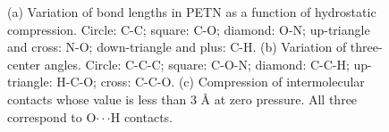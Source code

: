 \documentclass[prb,aps,nobibnotes,twocolumn,doublespace,twocolumngrid,superbib]{revtex4}
\begin{document}
\begin{figure}
\caption{(a) Variation of bond lengths in PETN as a function of hydrostatic 
compression.  Circle: C-C; square: C-O; diamond: O-N; up-triangle and
cross: N-O; down-triangle and plus: C-H.  (b) Variation of
three-center angles. Circle: C-C-C; square: C-O-N; diamond: C-C-H;
up-triangle: H-C-O; cross: C-C-O. (c) Compression of intermolecular
contacts whose value is less than 3 \AA\/ at zero pressure.  All three
correspond to O$\cdot\cdot\cdot$H contacts.}
\label{fig:intramolecular}
\end{figure}
\end{document}
